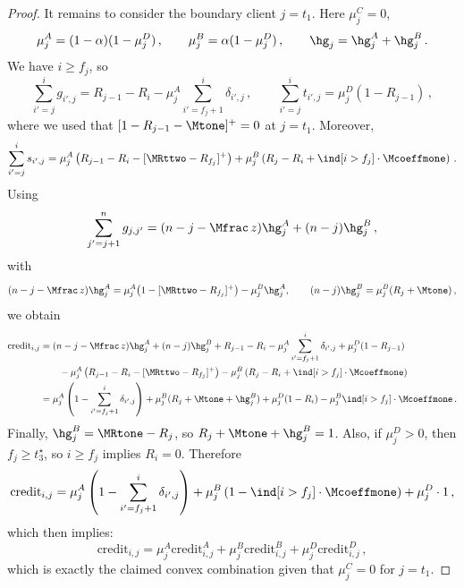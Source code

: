 \begin{proof}
    It remains to consider the boundary client $j=t_1$. Here $\mu_j^C=0$,
    \begin{equation*}
        \mu_j^A=(1-\alpha)(1-\mu_j^D)\,,
        \qquad
        \mu_j^B=\alpha(1-\mu_j^D)\,,
        \qquad
        \hg_j=\hg_j^A+\hg_j^B\,.
    \end{equation*}
    We have $i\ge f_j$, so
    \begin{equation*}
        \sum_{i'=j}^{i} g_{i',j}=R_{j-1}-R_i-\mu_j^A\sum_{i'=f_j+1}^{i}\delta_{i',j}\,,
        \qquad
        \sum_{i'=j}^{i} t_{i',j}=\mu_j^D(1-R_{j-1})\,,
    \end{equation*}
    where we used that $[1-R_{j-1}-\Mtone]^+=0$ at $j=t_1$.
    Moreover,
    \begin{equation*}
        \sum_{i'=j}^{i} s_{i',j}
        = \mu_j^A\left(R_{j-1}-R_i-[\MRttwo-R_{f_j}]^+\right)
        + \mu_j^B\left(R_j-R_i+\ind[i>f_j]\cdot\Mcoeffmone\right)\,.
    \end{equation*}
    Using
    \begin{equation*}
        \sum_{j'=j+1}^{n} g_{j,j'}=(n-j-\Mfrac\, z)\hg_j^A+(n-j)\hg_j^B\,,
    \end{equation*}
    with
    \begin{equation*}
        (n-j-\Mfrac\, z)\hg_j^A=
        \mu_j^A\bigl(1-[\MRttwo-R_{f_j}]^+\bigr)-\mu_j^B\hg_j^A,
        \qquad
        (n-j)\hg_j^B=
        \mu_j^B(R_j+\Mtone)\,,
    \end{equation*}
    we obtain
    \begin{align*}
        \text{credit}_{i,j}
        &= (n-j-\Mfrac\, z)\hg_j^A+(n-j)\hg_j^B + R_{j-1}-R_i - \mu_j^A\sum_{i'=f_j+1}^{i}\delta_{i',j} + \mu_j^D(1-R_{j-1}) \\
        &\qquad - \mu_j^A\left(R_{j-1}-R_i-[\MRttwo-R_{f_j}]^+\right)
        - \mu_j^B\left(R_j-R_i+\ind[i>f_j]\cdot\Mcoeffmone\right) \\
        &= \mu_j^A\left(1-\sum_{i'=f_j+1}^{i}\delta_{i',j}\right)
        + \mu_j^B(R_j+\Mtone+\hg_j^B)
        + \mu_j^D(1-R_i)
        - \mu_j^B\ind[i>f_j]\cdot\Mcoeffmone\,.
    \end{align*}
    Finally, $\hg_j^B=\MRtone - R_j$, so $R_j+\Mtone+\hg_j^B=1$. Also, if $\mu_j^D>0$, then $f_j\geq t_3^\star$, so $i\ge f_j$ implies $R_i=0$. Therefore
    \begin{equation*}
        \text{credit}_{i,j}
        = \mu_j^A\left(1-\sum_{i'=f_j+1}^{i}\delta_{i',j}\right)
        + \mu_j^B\left(1-\ind[i>f_j]\cdot\Mcoeffmone\right)
        + \mu_j^D\cdot 1\,,
    \end{equation*}
    which then implies:
    \begin{equation*}
        \text{credit}_{i,j}
        = \mu_j^A\text{credit}_{i,j}^A
        + \mu_j^B\text{credit}_{i,j}^B
        + \mu_j^D\text{credit}_{i,j}^D\,,
    \end{equation*}
    which is exactly the claimed convex combination given that $\mu_j^C=0$ for $j=t_1$.
\end{proof}

